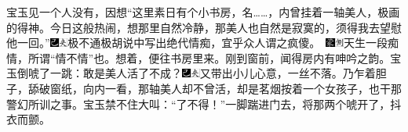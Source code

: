 宝玉见一个人没有，因想``这里素日有个小书房，名\ldots{}\ldots{}，内曾挂着一轴美人，极画的得神。今日这般热闹，想那里自然冷静，那美人也自然是寂寞的，须得我去望慰他一回。''{\includegraphics[width=3mm]{../Images/00003}\includegraphics[width=3mm]{../Images/00012}\footnotesize \kaishu 极不通极胡说中写出绝代情痴，宜乎众人谓之疯傻。　\includegraphics[width=3mm]{../Images/00006}\includegraphics[width=3mm]{../Images/00011}\footnotesize \kaishu 天生一段痴情，所谓``情不情''也。}想着，便往书房里来。刚到窗前，闻得房内有呻吟之韵。宝玉倒唬了一跳：敢是美人活了不成？{\includegraphics[width=3mm]{../Images/00003}\includegraphics[width=3mm]{../Images/00012}\footnotesize \kaishu 又带出小儿心意，一丝不落。}乃乍着胆子，舔破窗纸，向内一看，那轴美人却不曾活，却是茗烟按着一个女孩子，也干那警幻所训之事。宝玉禁不住大叫：``了不得！''一脚踹进门去，将那两个唬开了，抖衣而颤。

